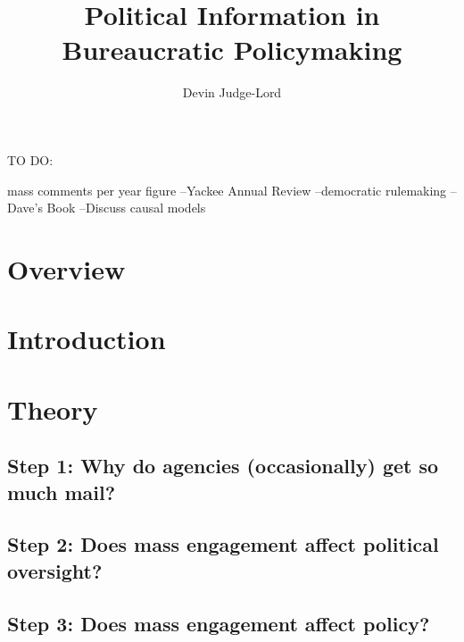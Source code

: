 \documentclass{article}
\title{Political Information in Bureaucratic Policymaking}
\author{Devin Judge-Lord} %
\begin{document}
\doublespace

\maketitle
\abstract{}

TO DO: 

mass comments per year figure 
--Yackee Annual Review 
--democratic rulemaking 
--Dave's Book
--Discuss causal models 


\newpage
\tableofcontents

\section*{Overview}


\section{Introduction} \label{intro}


\section{Theory} 

\subsection{Step 1: Why do agencies (occasionally) get so much mail?} \label{whymail-intro}


\subsection{Step 2: Does mass engagement affect political oversight?} \label{principals-intro}


\subsection{Step 3: Does mass engagement affect policy?} \label{influence-intro}




\end{document}
